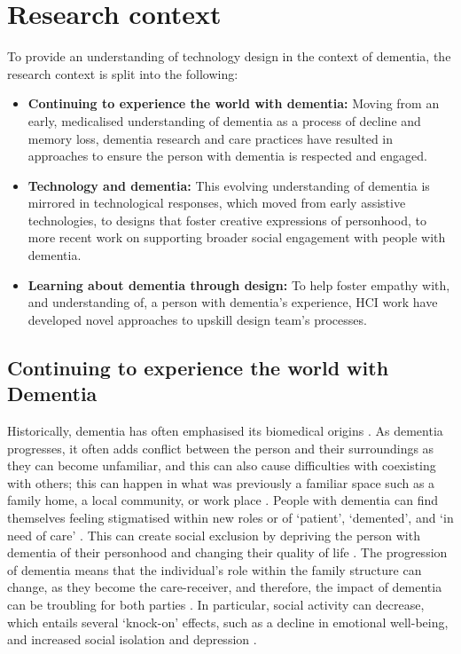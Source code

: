 \section{Research context}
\label{Intro: ResearchContext}
To provide an understanding of technology design in the context of dementia, the research context is split into the following: 
\begin{itemize}
\item \textbf{Continuing to experience the world with dementia:} Moving from an early, medicalised understanding of dementia as a process of decline and memory loss, dementia research and care practices have resulted in approaches to ensure the person with dementia is respected and engaged.

\item \textbf{Technology and dementia:} This evolving understanding of dementia is mirrored in technological responses, which moved from early assistive technologies, to designs that foster creative expressions of personhood, to more recent work on supporting broader social engagement with people with dementia.


\item \textbf{Learning about dementia through design:} To help foster empathy with, and understanding of, a person with dementia's experience, HCI work have developed novel approaches to upskill design team's processes.

\end{itemize}


\subsection{Continuing to experience the world with Dementia}
\label{Context:Dementia}
Historically, dementia has often emphasised its biomedical origins \citep{lyman_bringing_1989}. As dementia progresses, it often adds conflict between the person and their surroundings as they can become unfamiliar, and this can also cause difficulties with coexisting with others; this can happen in what was previously a familiar space such as a family home, a local community, or work place \citep{langdon_making_2007}. People with dementia can find themselves feeling stigmatised within new roles or of `patient', `demented', and `in need of care' \citep{cohen-mansfield_utilization_2006}. This can create social exclusion by depriving the person with dementia of their personhood and changing their quality of life \citep{lawrence_improving_2012}. The progression of dementia means that the individual's role within the family structure can change, as they become the care-receiver, and therefore, the impact of dementia can be troubling for both parties \citep{dupuis_moving_2012}. In particular, social activity can decrease, which entails several `knock-on' effects, such as a decline in emotional well-being, and increased social isolation and depression \citep{bartlett_citizenship_2014}. 

